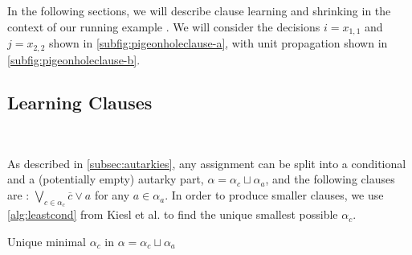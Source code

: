 In the following sections, we will describe \pr clause learning and shrinking in
the context of our running example  . We will consider the decisions $i =
x_{1, 1}$ and $j = x_{2, 2}$ shown in \autoref{subfig:pigeonholeclause-a}, with
unit propagation shown in \autoref{subfig:pigeonholeclause-b}.







\subsection{Learning \pr Clauses}~\label{subsec:learning}


As described in \autoref{subsec:autarkies}, any assignment can be split into a
conditional and a (potentially empty) autarky part, $\alpha = \alpha_c \sqcup \alpha_a$, and the
following clauses are \pr: $\bigvee_{c \in \alpha_c} \overline{c} \lor a$ for
any $a \in \alpha_a$. In order to produce smaller \pr clauses, we use
\autoref{alg:leastcond} from Kiesl et al. \cite{conditionalautarkies} to find
the unique smallest possible $\alpha_c$.



\begin{algorithm}
    \caption{Unique minimal $\alpha_c$ in $\alpha = \alpha_c \sqcup
    \alpha_a$}\label{alg:leastcond} \SetAlgoNoLine
     
      

\end{algorithm}

